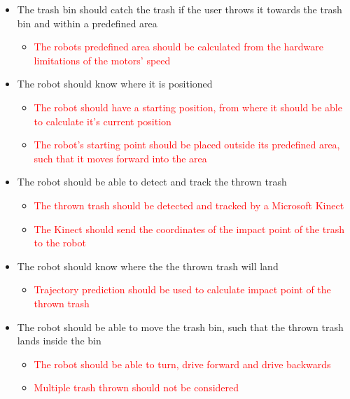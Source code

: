 \begin{itemize}
\item The trash bin should catch the trash if the user throws it towards the trash bin and within a predefined area
\begin{itemize}
\item \textcolor{red}{The robots predefined area should be calculated from the hardware limitations of the motors’ speed}
\end{itemize}
\item The robot should know where it is positioned
\begin{itemize}
\item \textcolor{red}{The robot should have a starting position, from where it should be able to calculate it's current position }
\item \textcolor{red}{The robot's starting point should be placed outside its predefined area, such that it moves forward into the area}
\end{itemize}
\item The robot should be able to detect and track the thrown trash
\begin{itemize}
\item \textcolor{red}{The thrown trash should be detected and tracked by a Microsoft Kinect}
\item \textcolor{red}{The Kinect should send the coordinates of the impact point of the trash to the robot}
\end{itemize}
\item The robot should know where the the thrown trash will land
\begin{itemize}
\item \textcolor{red}{Trajectory prediction should be used to calculate impact point of the thrown trash}
\end{itemize}
\item The robot should be able to move the trash bin, such that the thrown trash lands inside the bin
\begin{itemize}
\item \textcolor{red}{The robot should be able to turn, drive forward and drive backwards}
\item \textcolor{red}{Multiple trash thrown should not be considered}
\end{itemize}
\end{itemize}